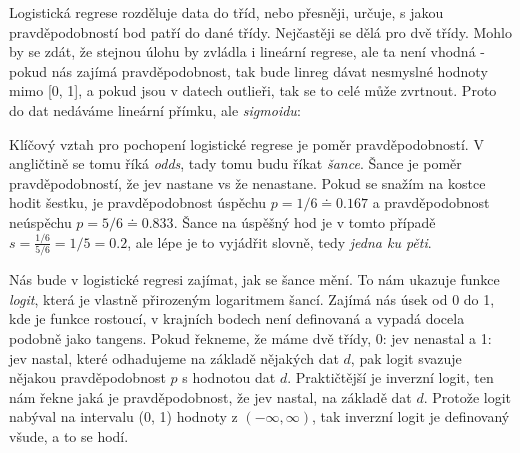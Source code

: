 \documentclass[10pt,a4paper]{article}
\begin{document}
Logistická regrese rozděluje data do tříd, nebo přesněji, určuje, s jakou pravděpodobností bod patří do dané třídy. Nejčastěji se dělá pro dvě třídy. Mohlo by se zdát, že stejnou úlohu by zvládla i lineární regrese, ale ta není vhodná - pokud nás zajímá pravděpodobnost, tak bude linreg dávat nesmyslné hodnoty mimo [0, 1], a pokud jsou v datech outlieři, tak se to celé může zvrtnout. Proto do dat nedáváme lineární přímku, ale \textit{sigmoidu}:

\begin{figure}[ht!]
\centering
{}
\end{figure}

Klíčový vztah pro pochopení logistické regrese je poměr pravděpodobností. V angličtině se tomu říká \textit{odds}, tady tomu budu říkat \textit{šance}. Šance je poměr pravděpodobností, že jev nastane vs že nenastane. Pokud se snažím na kostce hodit šestku, je pravděpodobnost úspěchu $p=1/6 \doteq 0.167$ a pravděpodobnost neúspěchu $p = 5/6 \doteq 0.833$. Šance na úspěšný hod je v tomto případě $s = \frac{1/6}{5/6} = 1/5 = 0.2$, ale lépe je to vyjádřit slovně, tedy \textit{jedna ku pěti}.

Nás bude v logistické regresi zajímat, jak se šance mění. To nám ukazuje funkce \textit{logit}, která je vlastně přirozeným logaritmem šancí. Zajímá nás úsek od 0 do 1, kde je funkce rostoucí, v krajních bodech není definovaná a vypadá docela podobně jako tangens. Pokud řekneme, že máme dvě třídy, 0: jev nenastal a 1: jev nastal, které odhadujeme na základě nějakých dat $d$, pak logit svazuje nějakou pravděpodobnost $p$ s hodnotou dat $d$. Praktičtější je inverzní logit, ten nám řekne jaká je pravděpodobnost, že jev nastal, na základě dat $d$. Protože logit nabýval na intervalu (0, 1) hodnoty z $(-\infty, \infty)$, tak inverzní logit je definovaný všude, a to se hodí.
\end{document}
